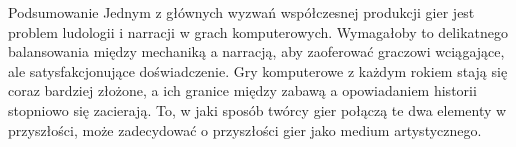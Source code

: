 \begin{frame}{Podsumowanie}
Jednym z głównych wyzwań współczesnej produkcji gier jest problem ludologii i narracji w grach komputerowych. Wymagałoby to delikatnego balansowania między mechaniką a narracją, aby zaoferować graczowi wciągające, ale satysfakcjonujące doświadczenie. Gry komputerowe z każdym rokiem stają się coraz bardziej złożone, a ich granice między zabawą a opowiadaniem historii stopniowo się zacierają. To, w jaki sposób twórcy gier połączą te dwa elementy w przyszłości, może zadecydować o przyszłości gier jako medium artystycznego.
\end{frame}
